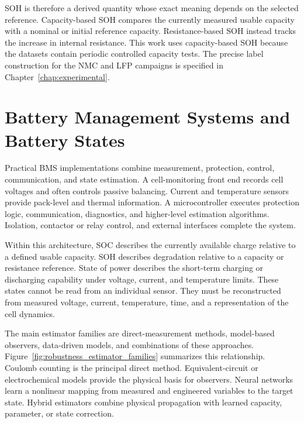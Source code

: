 \documentclass[
    a4paper,
    12pt,
    titlepage,
    bibliography=totoc,
    twoside=on,
    parskip=false,
    numbers=noenddot,
    cleardoublepage=empty,
    DIV=12,
    BCOR=12.0mm,
    headheight=36pt,
    headings=openright
]{scrreprt}
\begin{document}
SOH is therefore a derived quantity whose exact meaning depends on the selected reference. Capacity-based SOH compares the currently measured usable capacity with a nominal or initial reference capacity. Resistance-based SOH instead tracks the increase in internal resistance. This work uses capacity-based SOH because the datasets contain periodic controlled capacity tests. The precise label construction for the NMC and LFP campaigns is specified in Chapter~\ref{chap:experimental}.

\section{Battery Management Systems and Battery States}
Practical BMS implementations combine measurement, protection, control, communication, and state estimation. A cell-monitoring front end records cell voltages and often controls passive balancing. Current and temperature sensors provide pack-level and thermal information. A microcontroller executes protection logic, communication, diagnostics, and higher-level estimation algorithms. Isolation, contactor or relay control, and external interfaces complete the system.\autocite{BQ7961616SeriesBattery2023,10sBatteryPack,DesignConsiderationsCurrent,TLE4972HighPrecision,TMCS11083Functional}

Within this architecture, SOC describes the currently available charge relative to a defined usable capacity. SOH describes degradation relative to a capacity or resistance reference. State of power describes the short-term charging or discharging capability under voltage, current, and temperature limits. These states cannot be read from an individual sensor. They must be reconstructed from measured voltage, current, temperature, time, and a representation of the cell dynamics.\autocite{plettBatteryManagementSystems2015,zhouStateEstimationModels2023a,jiangAdvancesBatteryState2024}

The main estimator families are direct-measurement methods, model-based observers, data-driven models, and combinations of these approaches. Figure~\ref{fig:robustness_estimator_families} summarizes this relationship. Coulomb counting is the principal direct method. Equivalent-circuit or electrochemical models provide the physical basis for observers. Neural networks learn a nonlinear mapping from measured and engineered variables to the target state. Hybrid estimators combine physical propagation with learned capacity, parameter, or state correction.\autocite{khanComparativeStudyDifferent2022,gaoEnhancedStateofchargeEstimation2022,guoSystematicReviewElectrochemical2024,hossainlipuDatadrivenStateCharge2020}
\end{document}
